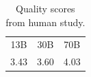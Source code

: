 \begin{table}[!t]
\caption{Quality scores from human study.}
\label{table:few_shots_2}
\begin{center}
\begin{tabular}{ccc}
\toprule
13B & 30B & 70B\\
3.43 & 3.60 & 4.03 \\
\bottomrule
\end{tabular}
\end{center}
\end{table}